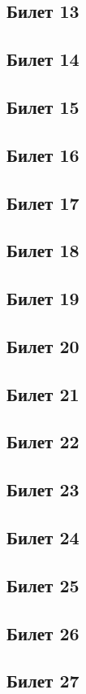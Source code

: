 \subsection*{Билет 13}
\subsection*{Билет 14}
\subsection*{Билет 15}
\subsection*{Билет 16}
\subsection*{Билет 17}
\subsection*{Билет 18}
\subsection*{Билет 19}
\subsection*{Билет 20}
\subsection*{Билет 21}
\subsection*{Билет 22}
\subsection*{Билет 23}
\subsection*{Билет 24}
\subsection*{Билет 25}
\subsection*{Билет 26}
\subsection*{Билет 27}